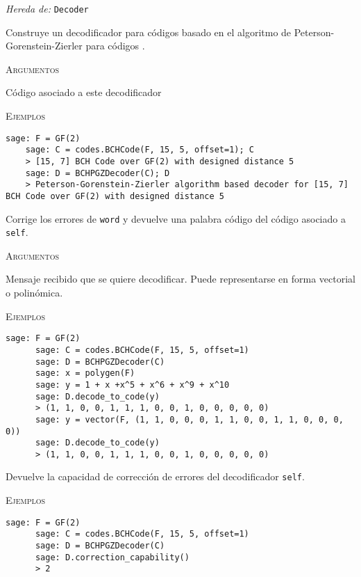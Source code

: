 \begin{description}[leftmargin=1em, font=\normalfont\ttfamily, style=nextline]
  \item[class BCHPGZDecoder(self, code)]
  
  \emph{Hereda de:} \texttt{Decoder}

  Construye un decodificador para códigos  basado en el algoritmo de Peterson-Gorenstein-Zierler para códigos .

  \textsc{Argumentos}
  \begin{description}[font=\normalfont\ttfamily]
    \item[code] Código asociado a este decodificador
  \end{description}

  \textsc{Ejemplos}
  \begin{lstlisting}[gobble=4]
    sage: F = GF(2)
    sage: C = codes.BCHCode(F, 15, 5, offset=1); C
    > [15, 7] BCH Code over GF(2) with designed distance 5
    sage: D = BCHPGZDecoder(C); D
    > Peterson-Gorenstein-Zierler algorithm based decoder for [15, 7] BCH Code over GF(2) with designed distance 5
  \end{lstlisting}

  \begin{description}[font=\ttfamily, style=nextline]
    \item[decode\_to\_code(self, word)] Corrige los errores de \texttt{word} y devuelve una palabra código del código asociado a \texttt{self}.
    
    \textsc{Argumentos}
    \begin{description}[font=\normalfont\ttfamily]
      \item[word] Mensaje recibido que se quiere decodificar. 
      Puede representarse en forma vectorial o polinómica.
    \end{description}
    
    \textsc{Ejemplos}
    \begin{lstlisting}[gobble=6]
      sage: F = GF(2)
      sage: C = codes.BCHCode(F, 15, 5, offset=1)
      sage: D = BCHPGZDecoder(C)
      sage: x = polygen(F)
      sage: y = 1 + x +x^5 + x^6 + x^9 + x^10
      sage: D.decode_to_code(y)
      > (1, 1, 0, 0, 1, 1, 1, 0, 0, 1, 0, 0, 0, 0, 0)
      sage: y = vector(F, (1, 1, 0, 0, 0, 1, 1, 0, 0, 1, 1, 0, 0, 0, 0))
      sage: D.decode_to_code(y)
      > (1, 1, 0, 0, 1, 1, 1, 0, 0, 1, 0, 0, 0, 0, 0)
    \end{lstlisting}

    \item[correction\_capability(self)] Devuelve la capacidad de corrección de errores del decodificador \texttt{self}.
    
    \textsc{Ejemplos}
    \begin{lstlisting}[gobble=6]
      sage: F = GF(2)
      sage: C = codes.BCHCode(F, 15, 5, offset=1)
      sage: D = BCHPGZDecoder(C)
      sage: D.correction_capability()
      > 2
    \end{lstlisting}
  \end{description}
\end{description}

